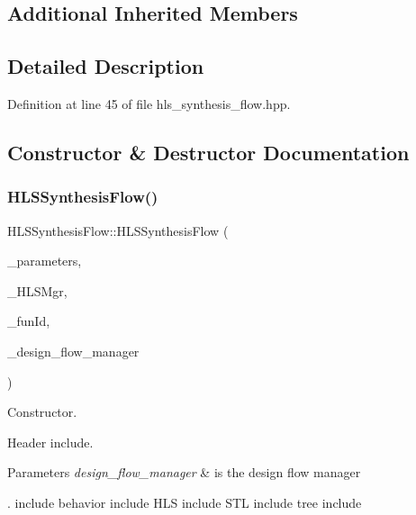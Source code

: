 \subsection*{Additional Inherited Members}


\subsection{Detailed Description}


Definition at line 45 of file hls\+\_\+synthesis\+\_\+flow.\+hpp.



\subsection{Constructor \& Destructor Documentation}
\mbox{\label{classHLSSynthesisFlow_a1880dd0f3096c271b622fe7bf599e9a5}} 
\subsubsection{\texorpdfstring{H\+L\+S\+Synthesis\+Flow()}{HLSSynthesisFlow()}}
{\footnotesize\ttfamily H\+L\+S\+Synthesis\+Flow\+::\+H\+L\+S\+Synthesis\+Flow (\begin{DoxyParamCaption}\item[{const \hyperlink{Parameter_8hpp_a37841774a6fcb479b597fdf8955eb4ea}{Parameter\+Const\+Ref}}]{\+\_\+parameters,  }\item[{const \hyperlink{hls__manager_8hpp_acd3842b8589fe52c08fc0b2fcc813bfe}{H\+L\+S\+\_\+manager\+Ref}}]{\+\_\+\+H\+L\+S\+Mgr,  }\item[{unsigned int}]{\+\_\+fun\+Id,  }\item[{const Design\+Flow\+Manager\+Const\+Ref}]{\+\_\+design\+\_\+flow\+\_\+manager }\end{DoxyParamCaption})}



Constructor. 

Header include.


\begin{DoxyParams}{Parameters}
{\em design\+\_\+flow\+\_\+manager} & is the design flow manager\\
\hline
\end{DoxyParams}
. include behavior include H\+LS include S\+TL include tree include 

